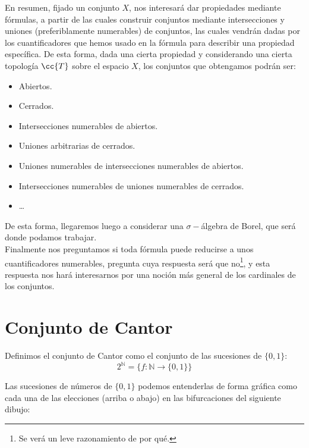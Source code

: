 En resumen, fijado un conjunto $X$, nos interesará dar propiedades mediante fórmulas, a partir de las cuales construir conjuntos mediante intersecciones y uniones (preferiblamente numerables) de conjuntos, las cuales vendrán dadas por los cuantificadores que hemos usado en la fórmula para describir una propiedad específica. De esta forma, dada una cierta propiedad y considerando una cierta topología $\cc{T}$ sobre el espacio $X$, los conjuntos que obtengamos podrán ser:
\begin{itemize}
    \item Abiertos.
    \item Cerrados.
    \item Intersecciones numerables de abiertos.
    \item Uniones arbitrarias de cerrados.
    \item Uniones numerables de intersecciones numerables de abiertos.
    \item Intersecciones numerables de uniones numerables de cerrados.
    \item \ldots
\end{itemize}
De esta forma, llegaremos luego a considerar una $\sigma-$álgebra de Borel, que será donde podamos trabajar.\\

Finalmente nos preguntamos si toda fórmula puede reducirse a unos cuantificadores numerables, pregunta cuya respuesta será que no\footnote{Se verá un leve razonamiento de por qué.}, y esta respuesta nos hará interesarnos por una noción más general de los cardinales de los conjuntos.

\section{Conjunto de Cantor}
\begin{definicion}
    Definimos el conjunto de Cantor como el conjunto de las sucesiones de $\{0,1\}$:
    \begin{equation*}
        2^{\mathbb{N}} = \{f:\mathbb{N}\to \{0,1\}\}
    \end{equation*}
\end{definicion}
\noindent
Las sucesiones de números de $\{{0,1}\}$ podemos entenderlas de forma gráfica como cada una de las elecciones (arriba o abajo) en las bifurcaciones del siguiente dibujo:
\begin{figure}[H]
    \centering
\end{figure}

